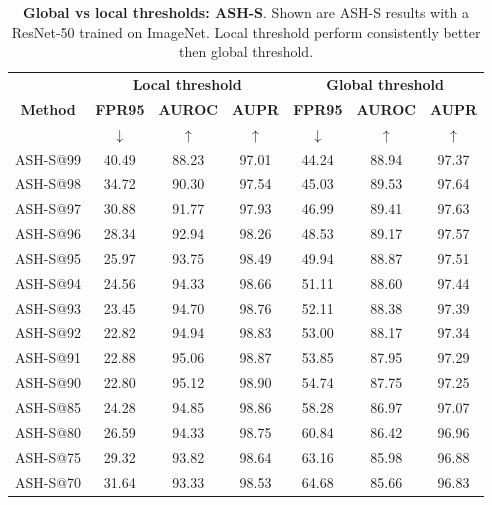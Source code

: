 \documentclass{article}
\newcommand{\tablabel}[1]{\label{tab:#1}}
\begin{document}
\begin{table}[hbt!]
\centering
\begin{tabular}{c c c c | c c c}
             & \multicolumn{3}{c}{\textbf{Local threshold}} & \multicolumn{3}{c}{\textbf{Global threshold}} \\
            \textbf{Method} & \textbf{FPR95} & \textbf{AUROC} & \textbf{AUPR} & \textbf{FPR95} & \textbf{AUROC} & \textbf{AUPR} \\
             & $\downarrow$ & $\uparrow$ & \multicolumn{1}{c}{$\uparrow$} & $\downarrow$ & $\uparrow$ & \multicolumn{1}{c}{$\uparrow$} \\
            \midrule
            ASH-S@99 & 40.49 & 88.23 & 97.01 & 44.24 & 88.94 & 97.37 \\
            ASH-S@98 & 34.72 & 90.30 & 97.54 & 45.03 & 89.53 & 97.64 \\
            ASH-S@97 & 30.88 & 91.77 & 97.93 & 46.99 & 89.41 & 97.63 \\
            ASH-S@96 & 28.34 & 92.94 & 98.26 & 48.53 & 89.17 & 97.57 \\
            ASH-S@95 & 25.97 & 93.75 & 98.49 & 49.94 & 88.87 & 97.51 \\
            ASH-S@94 & 24.56 & 94.33 & 98.66 & 51.11 & 88.60 & 97.44 \\
            ASH-S@93 & 23.45 & 94.70 & 98.76 & 52.11 & 88.38 & 97.39 \\
            ASH-S@92 & 22.82 & 94.94 & 98.83 & 53.00 & 88.17 & 97.34 \\
            ASH-S@91 & 22.88 & 95.06 & 98.87 & 53.85 & 87.95 & 97.29 \\
            ASH-S@90 & 22.80 & 95.12 & 98.90 & 54.74 & 87.75 & 97.25 \\
            ASH-S@85 & 24.28 & 94.85 & 98.86 & 58.28 & 86.97 & 97.07 \\
            ASH-S@80 & 26.59 & 94.33 & 98.75 & 60.84 & 86.42 & 96.96 \\
            ASH-S@75 & 29.32 & 93.82 & 98.64 & 63.16 & 85.98 & 96.88 \\
            ASH-S@70 & 31.64 & 93.33 & 98.53 & 64.68 & 85.66 & 96.83 \\
            \midrule
\end{tabular}
\caption{\textbf{Global vs local thresholds: ASH-S}. Shown are ASH-S results with a ResNet-50 trained on ImageNet. Local threshold perform consistently better then global threshold.} 
\tablabel{ash-s-global}
\end{table}
\end{document}
